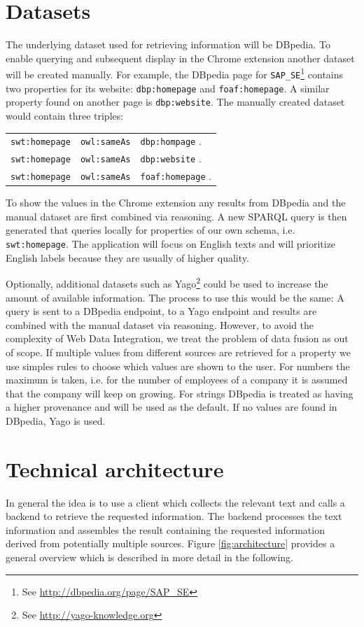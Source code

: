 \documentclass[11pt,titlepage,oneside,openany]{article}
\begin{document}
\section{Datasets}
The underlying dataset used for retrieving information will be
DBpedia. To enable querying and
subsequent display in the Chrome extension another dataset will be created manually.
For example, the DBpedia page for 
\texttt{SAP\_SE}\footnote{See \url{http://dbpedia.org/page/SAP\_SE}} contains
two properties for its website: \texttt{dbp:homepage} and \texttt{foaf:homepage}.
A similar property found on another page is \texttt{dbp:website}. The manually
created dataset would contain three triples:
\begin{center}
\begin{tabular}{lll}
\texttt{swt:homepage} & \texttt{owl:sameAs} & \texttt{dbp:hompage} .   \\
\texttt{swt:homepage} & \texttt{owl:sameAs} & \texttt{dbp:website} .   \\
\texttt{swt:homepage} & \texttt{owl:sameAs} & \texttt{foaf:homepage} .
\end{tabular}
\end{center}

To show the values in the Chrome extension any results from DBpedia and the
manual dataset are first combined via reasoning. A new SPARQL query is then
generated that queries locally for properties of our own schema, i.e.
\texttt{swt:homepage}. The application will focus on English texts and will
prioritize English labels because they are usually of higher quality. 

Optionally, additional datasets such as
Yago\footnote{See \url{http://yago-knowledge.org}} could be used to increase the
amount of available information. The process to use this would be the same: A query is sent to a DBpedia endpoint, to a Yago
endpoint and results are combined with the manual dataset via reasoning. 
However, to avoid the complexity of Web Data Integration, we treat the problem of data fusion as out of scope. If multiple values from different sources are
retrieved for a property we use simples rules to choose which values are shown
to the user. For numbers the maximum is taken, i.e. for the number of employees
of a company it is assumed that the company will keep on growing. For strings
DBpedia is treated as having a higher provenance and will be used as the
default. If no values are found in DBpedia, Yago is used. 



\section{Technical architecture}
In general the idea is to use a client which collects the relevant text and calls a backend to retrieve the requested information. The backend processes the text information and assembles the result containing the requested information derived from potentially multiple sources. Figure \ref{fig:architecture} provides a general overview which is described in more detail in the following. 
\end{document}
